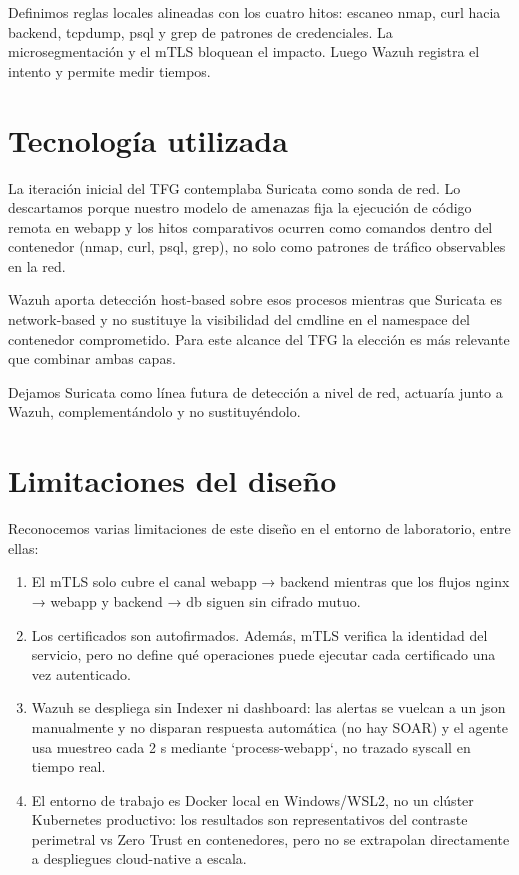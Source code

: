 \documentclass[11pt,spanish,listoffigures,listoftables]{tfgetsinf}
\begin{document}
        Definimos reglas locales alineadas con los cuatro hitos: escaneo nmap, curl hacia backend, tcpdump, psql y grep de patrones de credenciales. La microsegmentación y el mTLS bloquean el impacto. Luego Wazuh registra el intento y permite medir tiempos. 

    \section{Tecnología utilizada}
    La iteración inicial del TFG contemplaba Suricata como sonda de red. Lo descartamos porque nuestro modelo de amenazas fija la ejecución de código remota en webapp y los hitos comparativos ocurren como comandos dentro del contenedor (nmap, curl, psql, grep), no solo como patrones de tráfico observables en la red.

    Wazuh aporta detección host-based sobre esos procesos mientras que Suricata es network-based y no sustituye la visibilidad del cmdline en el namespace del contenedor comprometido. Para este alcance del TFG la elección es más relevante que combinar ambas capas. 
    
    Dejamos Suricata como línea futura de detección a nivel de red, actuaría junto a Wazuh, complementándolo y no sustituyéndolo.
    
    \section{Limitaciones del diseño}
    Reconocemos varias limitaciones de este diseño en el entorno de laboratorio, entre ellas:

    \begin{enumerate}
        \item El mTLS solo cubre el canal webapp → backend mientras que los flujos nginx → webapp y backend → db siguen sin cifrado mutuo.
        \item Los certificados son autofirmados. Además, mTLS verifica la identidad del servicio, pero no define qué operaciones puede ejecutar cada certificado una vez autenticado.
        \item Wazuh se despliega sin Indexer ni dashboard: las alertas se vuelcan a un json manualmente y no disparan respuesta automática (no hay SOAR) y el agente usa muestreo cada 2 s mediante `process-webapp`, no trazado syscall en tiempo real.
        \item El entorno de trabajo es Docker local en Windows/WSL2, no un clúster Kubernetes productivo: los resultados son representativos del contraste perimetral vs Zero Trust en contenedores, pero no se extrapolan directamente a despliegues cloud-native a escala.
    \end{enumerate}
\end{document}
